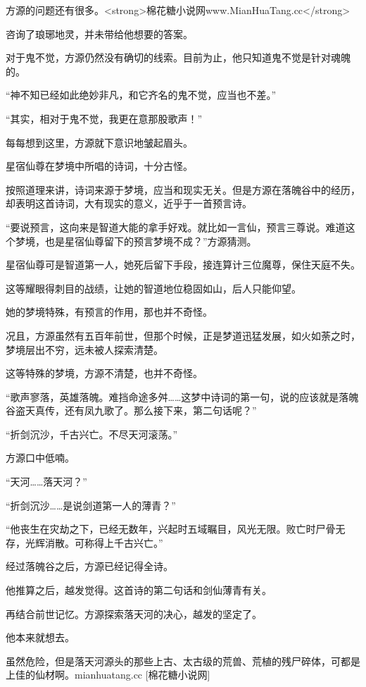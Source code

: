 
\begin{this_body}

方源的问题还有很多。<strong>棉花糖小说网www.MianHuaTang.cc</strong>

咨询了琅琊地灵，并未带给他想要的答案。

对于鬼不觉，方源仍然没有确切的线索。目前为止，他只知道鬼不觉是针对魂魄的。

“神不知已经如此绝妙非凡，和它齐名的鬼不觉，应当也不差。”

“其实，相对于鬼不觉，我更在意那股歌声！”

每每想到这里，方源就下意识地皱起眉头。

星宿仙尊在梦境中所唱的诗词，十分古怪。

按照道理来讲，诗词来源于梦境，应当和现实无关。但是方源在落魄谷中的经历，却表明这首诗词，大有现实的意义，近乎于一首预言诗。

“要说预言，这向来是智道大能的拿手好戏。就比如一言仙，预言三尊说。难道这个梦境，也是星宿仙尊留下的预言梦境不成？”方源猜测。

星宿仙尊可是智道第一人，她死后留下手段，接连算计三位魔尊，保住天庭不失。

这等耀眼得刺目的战绩，让她的智道地位稳固如山，后人只能仰望。

她的梦境特殊，有预言的作用，那也并不奇怪。

况且，方源虽然有五百年前世，但那个时候，正是梦道迅猛发展，如火如荼之时，梦境层出不穷，远未被人探索清楚。

这等特殊的梦境，方源不清楚，也并不奇怪。

“歌声寥落，英雄落魄。难挡命途多舛……这梦中诗词的第一句，说的应该就是落魄谷盗天真传，还有凤九歌了。那么接下来，第二句话呢？”

“折剑沉沙，千古兴亡。不尽天河滚荡。”

方源口中低喃。

“天河……落天河？”

“折剑沉沙……是说剑道第一人的薄青？”

“他丧生在灾劫之下，已经无数年，兴起时五域瞩目，风光无限。败亡时尸骨无存，光辉消散。可称得上千古兴亡。”

经过落魄谷之后，方源已经记得全诗。

他推算之后，越发觉得。这首诗的第二句话和剑仙薄青有关。

再结合前世记忆。方源探索落天河的决心，越发的坚定了。

他本来就想去。

虽然危险，但是落天河源头的那些上古、太古级的荒兽、荒植的残尸碎体，可都是上佳的仙材啊。mianhuatang.cc [棉花糖小说网]


\end{this_body}
